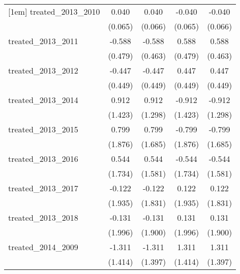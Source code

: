 {\begin{tabular}{l*{4}{c}}
[1em]
treated\_2013\_2010&       0.040         &       0.040         &      -0.040         &      -0.040         \\
            &     (0.065)         &     (0.066)         &     (0.065)         &     (0.066)         \\
[1em]
treated\_2013\_2011&      -0.588         &      -0.588         &       0.588         &       0.588         \\
            &     (0.479)         &     (0.463)         &     (0.479)         &     (0.463)         \\
[1em]
treated\_2013\_2012&      -0.447         &      -0.447         &       0.447         &       0.447         \\
            &     (0.449)         &     (0.449)         &     (0.449)         &     (0.449)         \\
[1em]
treated\_2013\_2014&       0.912         &       0.912         &      -0.912         &      -0.912         \\
            &     (1.423)         &     (1.298)         &     (1.423)         &     (1.298)         \\
[1em]
treated\_2013\_2015&       0.799         &       0.799         &      -0.799         &      -0.799         \\
            &     (1.876)         &     (1.685)         &     (1.876)         &     (1.685)         \\
[1em]
treated\_2013\_2016&       0.544         &       0.544         &      -0.544         &      -0.544         \\
            &     (1.734)         &     (1.581)         &     (1.734)         &     (1.581)         \\
[1em]
treated\_2013\_2017&      -0.122         &      -0.122         &       0.122         &       0.122         \\
            &     (1.935)         &     (1.831)         &     (1.935)         &     (1.831)         \\
[1em]
treated\_2013\_2018&      -0.131         &      -0.131         &       0.131         &       0.131         \\
            &     (1.996)         &     (1.900)         &     (1.996)         &     (1.900)         \\
[1em]
treated\_2014\_2009&      -1.311         &      -1.311         &       1.311         &       1.311         \\
            &     (1.414)         &     (1.397)         &     (1.414)         &     (1.397)         \\

\end{tabular}}

